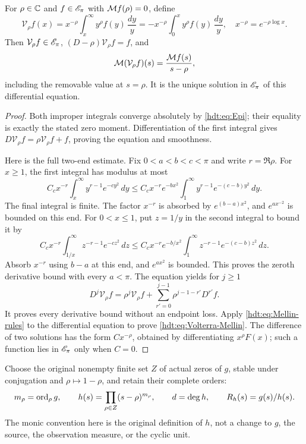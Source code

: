 \documentclass[11pt]{article}
\begin{document}
\begin{hdtlemma}
\label{hdt:lem:volterra}
For $\rho\in\mathbb C$ and $f\in\mathscr E_\pi$ with $\mathcal M f(\rho)=0$, define
\begin{equation}\label{hdt:eq:Volterra}
\mathcal V_\rho f(x)
=x^{-\rho}\int_x^\infty y^\rho f(y)\,\frac{dy}{y}
=-x^{-\rho}\int_0^x y^\rho f(y)\,\frac{dy}{y},
\quad x^{-\rho}=e^{-\rho\log x}.
\end{equation}
Then $\mathcal V_\rho f\in\mathscr E_\pi$,
$(D-\rho)\mathcal V_\rho f=f$, and
\begin{equation}\label{hdt:eq:Volterra-Mellin}
\mathcal M(\mathcal V_\rho f)(s)=\frac{\mathcal M f(s)}{s-\rho},
\end{equation}
including the removable value at $s=\rho$. It is the unique
solution in $\mathscr E_\pi$ of this differential equation.
\end{hdtlemma}
\begin{proof}
Both improper integrals converge absolutely by \eqref{hdt:eq:Epi};
their equality is exactly the stated zero moment. Differentiation
of the first integral gives $D\mathcal V_\rho f=\rho\mathcal
V_\rho f+f$, proving the equation and smoothness.

Here is the full two-end estimate. Fix $0<a<b<c<\pi$ and
write $r=\Re\rho$. For $x\geq1$, the first integral has modulus
at most
\[
C_c x^{-r}\int_x^\infty y^{r-1}e^{-cy^2}\,dy
\leq C_c x^{-r}e^{-bx^2}
\int_1^\infty y^{r-1}e^{-(c-b)y^2}\,dy.
\]
The final integral is finite. The factor $x^{-r}$ is absorbed by
$e^{(b-a)x^2}$, and $e^{ax^{-2}}$ is bounded on this end.
For $0<x\leq1$, put $z=1/y$ in the second integral to bound it by
\[
C_c x^{-r}\int_{1/x}^\infty z^{-r-1}e^{-cz^2}\,dz
\leq C_c x^{-r}e^{-b/x^2}
\int_1^\infty z^{-r-1}e^{-(c-b)z^2}\,dz.
\]
Absorb $x^{-r}$ using $b-a$ at this end, and $e^{ax^2}$ is bounded.
This proves the zeroth derivative bound with every $a<\pi$.
The equation yields for $j\geq1$
\[
D^j\mathcal V_\rho f
=\rho^j\mathcal V_\rho f+
\sum_{r'=0}^{j-1}\rho^{j-1-r'}D^{r'}f.
\]
It proves every derivative bound without an endpoint loss.
Apply \eqref{hdt:eq:Mellin-rules} to the differential equation to prove
\eqref{hdt:eq:Volterra-Mellin}. The difference of two solutions has the
form $Cx^{-\rho}$, obtained by differentiating $x^\rho F(x)$;
such a function lies in $\mathscr E_\pi$ only when $C=0$.
\end{proof}

Choose the original nonempty finite set $Z$ of actual zeros of $g$,
stable under conjugation and $\rho\mapsto1-\rho$, and retain their
complete orders:
\begin{equation}\label{hdt:eq:h}
m_\rho=\operatorname{ord}_\rho g,\qquad
h(s)=\prod_{\rho\in Z}(s-\rho)^{m_\rho},\qquad d=\deg h,
\qquad R_h(s)=g(s)/h(s).
\end{equation}
The monic convention here is the original definition of $h$, not a
change to $g$, the source, the observation measure, or the cyclic unit.
\end{document}
